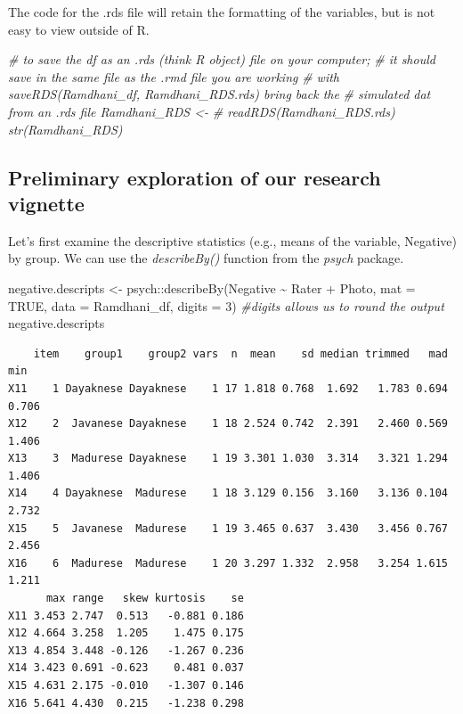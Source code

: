\documentclass[
  11pt,
]{book}
\newenvironment{Shaded}{\begin{snugshade}}{\end{snugshade}}
\newcommand{\AttributeTok}[1]{\textcolor[rgb]{0.77,0.63,0.00}{#1}}
\newcommand{\CommentTok}[1]{\textcolor[rgb]{0.56,0.35,0.01}{\textit{#1}}}
\newcommand{\ConstantTok}[1]{\textcolor[rgb]{0.00,0.00,0.00}{#1}}
\newcommand{\DecValTok}[1]{\textcolor[rgb]{0.00,0.00,0.81}{#1}}
\newcommand{\FunctionTok}[1]{\textcolor[rgb]{0.00,0.00,0.00}{#1}}
\newcommand{\NormalTok}[1]{#1}
\newcommand{\OtherTok}[1]{\textcolor[rgb]{0.56,0.35,0.01}{#1}}
\newcommand{\SpecialCharTok}[1]{\textcolor[rgb]{0.00,0.00,0.00}{#1}}
\begin{document}
The code for the .rds file will retain the formatting of the variables, but is not easy to view outside of R.

\begin{Shaded}
\begin{Highlighting}[]
\CommentTok{\# to save the df as an .rds (think \textquotesingle{}R object\textquotesingle{}) file on your computer;}
\CommentTok{\# it should save in the same file as the .rmd file you are working}
\CommentTok{\# with saveRDS(Ramdhani\_df, \textquotesingle{}Ramdhani\_RDS.rds\textquotesingle{}) bring back the}
\CommentTok{\# simulated dat from an .rds file Ramdhani\_RDS \textless{}{-}}
\CommentTok{\# readRDS(\textquotesingle{}Ramdhani\_RDS.rds\textquotesingle{}) str(Ramdhani\_RDS)}
\end{Highlighting}
\end{Shaded}

\hypertarget{preliminary-exploration-of-our-research-vignette}{%
\subsection{Preliminary exploration of our research vignette}\label{preliminary-exploration-of-our-research-vignette}}

Let's first examine the descriptive statistics (e.g., means of the variable, Negative) by group. We can use the \emph{describeBy()} function from the \emph{psych} package.

\begin{Shaded}
\begin{Highlighting}[]
\NormalTok{negative.descripts }\OtherTok{\textless{}{-}}\NormalTok{ psych}\SpecialCharTok{::}\FunctionTok{describeBy}\NormalTok{(Negative }\SpecialCharTok{\textasciitilde{}}\NormalTok{ Rater }\SpecialCharTok{+}\NormalTok{ Photo, }\AttributeTok{mat =} \ConstantTok{TRUE}\NormalTok{,}
    \AttributeTok{data =}\NormalTok{ Ramdhani\_df, }\AttributeTok{digits =} \DecValTok{3}\NormalTok{)  }\CommentTok{\#digits allows us to round the output}
\NormalTok{negative.descripts}
\end{Highlighting}
\end{Shaded}

\begin{verbatim}
    item    group1    group2 vars  n  mean    sd median trimmed   mad   min
X11    1 Dayaknese Dayaknese    1 17 1.818 0.768  1.692   1.783 0.694 0.706
X12    2  Javanese Dayaknese    1 18 2.524 0.742  2.391   2.460 0.569 1.406
X13    3  Madurese Dayaknese    1 19 3.301 1.030  3.314   3.321 1.294 1.406
X14    4 Dayaknese  Madurese    1 18 3.129 0.156  3.160   3.136 0.104 2.732
X15    5  Javanese  Madurese    1 19 3.465 0.637  3.430   3.456 0.767 2.456
X16    6  Madurese  Madurese    1 20 3.297 1.332  2.958   3.254 1.615 1.211
      max range   skew kurtosis    se
X11 3.453 2.747  0.513   -0.881 0.186
X12 4.664 3.258  1.205    1.475 0.175
X13 4.854 3.448 -0.126   -1.267 0.236
X14 3.423 0.691 -0.623    0.481 0.037
X15 4.631 2.175 -0.010   -1.307 0.146
X16 5.641 4.430  0.215   -1.238 0.298
\end{verbatim}
\end{document}
